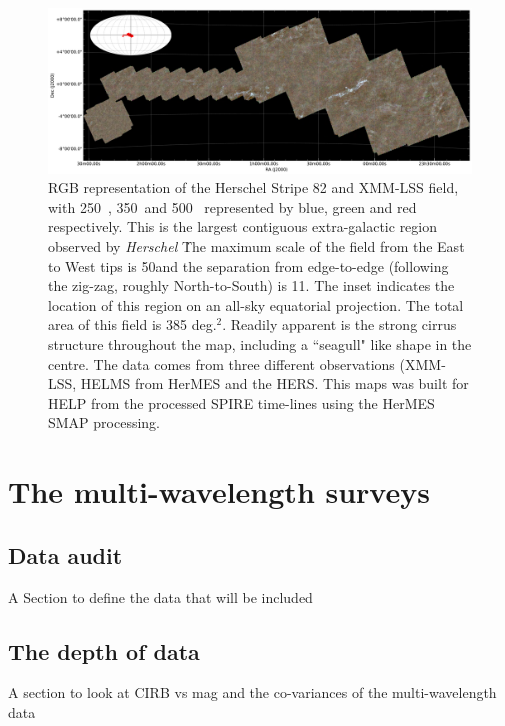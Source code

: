 \documentclass[usenatbib]{mnras}
\newcommand{\Herschel}{\textit{Herschel} }
\newcommand{\um}{\micron\  }
\begin{document}
\begin{figure}
  \centering \includegraphics[width=16cm, angle=0]{figs/helms_hers_xmm-lss-rgb-sm.pdf}

  \caption[Three-colour image of Herschel Strip 82 region]{RGB representation of
    the Herschel Stripe 82 and XMM-LSS field, with 250\um, 350\um and 500\um
    represented by blue, green and red respectively. This is the largest
    contiguous extra-galactic region observed by \Herschel\.  The maximum scale
    of the field from the East to West tips is  50\degr and the separation from
    edge-to-edge (following the zig-zag, roughly North-to-South) is 11\degr. The
    inset indicates the location of this region on an all-sky equatorial
    projection. The total area of  this field is 385 deg.$^2$. Readily apparent
    is the strong cirrus structure throughout the map, including a ``seagull"
    like shape in the centre.  The data comes from three different observations
    (XMM-LSS, HELMS from HerMES \citealt{Oliver:2012} and the HERS. This maps
    was built for HELP from the processed SPIRE time-lines using the HerMES SMAP
    processing.}\label{fig:hs82}
\end{figure}

\section{The multi-wavelength surveys}\label{sec:surveys}

\subsection{Data audit}
{\color{red} A Section to define the data that will be included}

\subsection{The depth of data}
{\color{red} A section to look at CIRB vs mag and the co-variances of the
multi-wavelength data }
\end{document}

